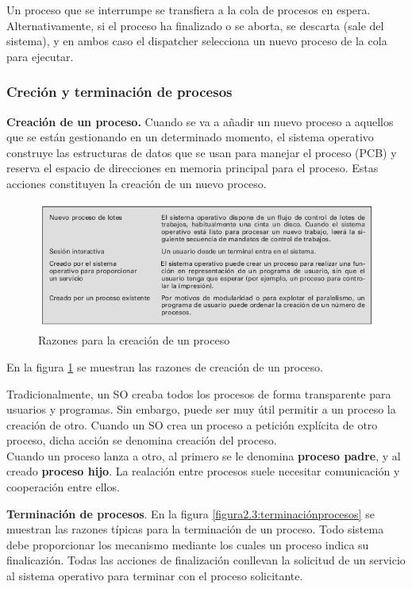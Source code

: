 \documentclass{article}
\begin{document}
				Un proceso que se interrumpe se transfiera a la cola de procesos en espera. Alternativamente, si el proceso ha finalizado o se aborta, se descarta (sale del sistema), y en ambos caso el dispatcher selecciona un nuevo proceso de la cola para ejecutar.
				
			\subsubsection{Creción y terminación de procesos}
				\textbf{Creación de un proceso.} Cuando se va a añadir un nuevo proceso a aquellos que se están gestionando en un determinado momento, el sistema operativo construye las estructuras de datos que
se usan para manejar el proceso (PCB) y reserva el espacio de direcciones en memoria principal para el proceso. Estas acciones constituyen la creación de un nuevo
proceso.
				\begin{figure}
				\caption{Razones para la creación de un proceso}
				\label{figura2.2:creacionprocesos}
				\centering
				\includegraphics[width=1.1\textwidth, scale=1]{tema_2_figura2.png}
				\end{figure}
				
				En la figura \ref{figura2.2:creacionprocesos} se muestran las razones de creación de un proceso.
				
				Tradicionalmente, un SO creaba todos los procesos de forma transparente para usuarios y programas. Sin embargo, puede ser muy útil permitir a un proceso la creación de otro. Cuando un SO crea un proceso a petición explícita de otro proceso, dicha acción se denomina creación del proceso. \\
				
				Cuando un proceso lanza a otro, al primero se le denomina \textbf{proceso padre}, y al creado \textbf{proceso hijo}. La realación entre procesos suele necesitar comunicación y cooperación entre ellos.
				
				\textbf{Terminación de procesos}. En la figura \ref{figura2.3:terminaciónprocesos} se muestran las razones típicas para la terminación de un proceso. Todo sistema debe proporcionar los mecanismo mediante los cuales un proceso indica su finalicazión. Todas las acciones de finalización conllevan la solicitud de un servicio al sistema operativo para terminar con el proceso solicitante.
				
\end{document}
